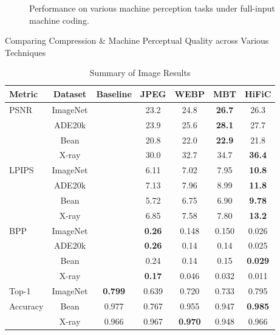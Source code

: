 \documentclass[10pt,twocolumn,letterpaper]{article}
\begin{document}
\begin{figure}
\begin{center}
\end{center}
\caption{\label{fig:mpq_results}%
Performance on various machine perception tasks under full-input machine coding.}
\end{figure}

\begin{table}[!htb]
    \caption{Comparing Compression \& Machine Perceptual Quality across Various Techniques}
    \label{tab:compression_comparison}
        \begin{subtable}{.6\linewidth}
      \centering
        \caption{Summary of Image Results}
        \label{tab:image_compression_comparison}
        \setlength{\tabcolsep}{3pt}
        {\small\begin{tabular}{lcccccc}
\toprule
Metric & Dataset & Baseline & JPEG & WEBP & MBT & HiFiC \\
\midrule
PSNR & ImageNet &  & 23.2 & 24.8 & \textbf{26.7} & 26.3 \\
     & ADE20k &  & 23.9 & 25.6 & \textbf{28.1} & 27.7 \\
     & Bean &  & 20.8 & 22.0 & \textbf{22.9} & 21.8 \\
     & X-ray &  & 30.0 & 32.7 & 34.7 & \textbf{36.4} \\
\midrule
LPIPS & ImageNet &  & 6.11 & 7.02 & 7.95 & \textbf{10.8} \\
      & ADE20k &  & 7.13 & 7.96 & 8.99 & \textbf{11.8 }\\
      & Bean &  & 5.72 & 6.75 & 6.90 & \textbf{9.78} \\
      & X-ray &  & 6.85 & 7.58 & 7.80 & \textbf{13.2} \\
\midrule
BPP & ImageNet &  & \textbf{0.26} & 0.148 & 0.150 & 0.026 \\
    & ADE20k &  & \textbf{0.26} & 0.14 & 0.14 & 0.025 \\
    & Bean &  & 0.24 & 0.14 & 0.15 & \textbf{0.029} \\
    & X-ray &  & \textbf{0.17} & 0.046 & 0.032 & 0.011 \\
\midrule
Top-1 & ImageNet & \textbf{0.799} & 0.639 & 0.720 & 0.733 & 0.795 \\
 Accuracy                        & Bean & 0.977 & 0.767 & 0.955 & 0.947 &\textbf{ 0.985} \\
                        & X-ray & 0.966 & 0.967 & \textbf{0.970} & 0.948 & 0.966 \\
\midrule

\end{tabular}}
\end{subtable}
\end{table}
\end{document}
